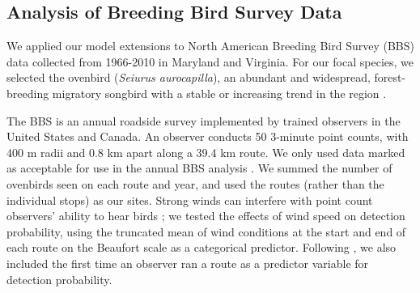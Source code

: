 \documentclass[12pt]{article}
\begin{document}

\subsection{Analysis of Breeding Bird Survey Data}

We applied our model extensions to North American Breeding Bird Survey
(BBS) data collected from 1966-2010 in %
Maryland and Virginia. For our focal species, we selected the
ovenbird (\textit{Seiurus aurocapilla}), an abundant and widespread,
forest-breeding migratory songbird with a stable or increasing trend
in the region \citep{porneluzi_etal:2011}. 

The BBS is an annual roadside survey implemented by trained
observers in the United States and Canada. An observer conducts 50
3-minute point counts, with 400 m radii and 0.8 km apart 
along a
39.4 km route. We only used data marked as acceptable for use in the annual BBS
analysis \citep{sauer_etal:1994auk}.  We summed the number of ovenbirds
seen on each route and year, and used the routes (rather
than the individual stops) as our sites.
Strong winds can interfere with point count observers' ability
to hear birds \citep{simons_etal:2007}; we tested the effects of wind
speed on detection probability, using the truncated mean of wind conditions at the start and end of
each route on the Beaufort scale as a categorical predictor. 
Following \citet{link_sauer:2002},
we also included the first time an observer ran a route as a predictor variable for detection
probability.
\end{document}
